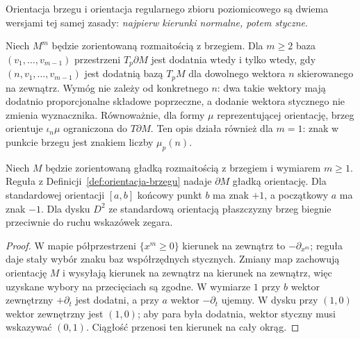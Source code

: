 Orientacja brzegu i orientacja regularnego zbioru
poziomicowego są dwiema wersjami tej samej zasady:
\emph{najpierw kierunki normalne, potem styczne}.

\begin{definicja}
\label{def:orientacja-brzegu}
Niech $M^m$ będzie zorientowaną rozmaitością z brzegiem.
Dla $m\geq2$ baza $(v_1,\ldots,v_{m-1})$ przestrzeni $T_p\partial M$
jest dodatnia wtedy i tylko wtedy, gdy
$(n,v_1,\ldots,v_{m-1})$ jest dodatnią bazą $T_pM$
dla dowolnego wektora $n$ skierowanego na zewnątrz.
Wymóg nie zależy od konkretnego $n$: dwa takie wektory
mają dodatnio proporcjonalne składowe poprzeczne,
a dodanie wektora stycznego nie zmienia wyznacznika.
Równoważnie, dla formy $\mu$ reprezentującej orientację,
brzeg orientuje $\iota_n\mu$ ograniczona do $T\partial M$.
Ten opis działa również dla $m=1$: znak w punkcie brzegu
jest znakiem liczby $\mu_p(n)$.
\end{definicja}

\begin{stwierdzenie}
\label{prop:brzeg-orientowalny}
Niech $M$ będzie zorientowaną gładką rozmaitością
z brzegiem i wymiarem $m\geq1$. Reguła
z Definicji~\ref{def:orientacja-brzegu}
nadaje $\partial M$ gładką orientację.
Dla standardowej orientacji $[a,b]$ końcowy punkt $b$
ma znak $+1$, a początkowy $a$ ma znak $-1$.
Dla dysku $D^2$ ze standardową orientacją płaszczyzny
brzeg biegnie przeciwnie do ruchu wskazówek zegara.
\end{stwierdzenie}
\begin{proof}
W mapie półprzestrzeni $\{x^m\geq0\}$ kierunek
na zewnątrz to $-\partial_{x^m}$; reguła daje
stały wybór znaku baz współrzędnych stycznych.
Zmiany map zachowują orientację $M$ i wysyłają
kierunek na zewnątrz na kierunek na zewnątrz,
więc uzyskane wybory na przecięciach są zgodne.
W wymiarze $1$ przy $b$ wektor zewnętrzny
$+\partial_t$ jest dodatni, a przy $a$ wektor
$-\partial_t$ ujemny. W dysku przy $(1,0)$
wektor zewnętrzny jest $(1,0)$; aby para była
dodatnia, wektor styczny musi wskazywać $(0,1)$.
Ciągłość przenosi ten kierunek na cały okrąg.
\end{proof}

